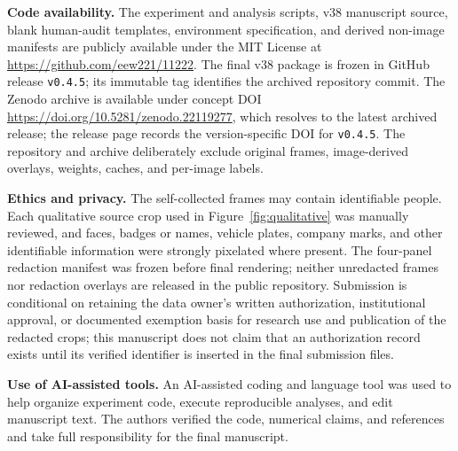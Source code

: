 \documentclass[iicol,pdflatex,sn-mathphys-num]{sn-jnl}
\begin{document}
\textbf{Code availability.} The experiment and analysis scripts, v38 manuscript source, blank human-audit templates, environment specification, and derived non-image manifests are publicly available under the MIT License at \url{https://github.com/eew221/11222}. The final v38 package is frozen in GitHub release \texttt{v0.4.5}; its immutable tag identifies the archived repository commit. The Zenodo archive is available under concept DOI \url{https://doi.org/10.5281/zenodo.22119277}, which resolves to the latest archived release; the release page records the version-specific DOI for \texttt{v0.4.5}. The repository and archive deliberately exclude original frames, image-derived overlays, weights, caches, and per-image labels.

\textbf{Ethics and privacy.} The self-collected frames may contain identifiable people. Each qualitative source crop used in Figure~\ref{fig:qualitative} was manually reviewed, and faces, badges or names, vehicle plates, company marks, and other identifiable information were strongly pixelated where present. The four-panel redaction manifest was frozen before final rendering; neither unredacted frames nor redaction overlays are released in the public repository. Submission is conditional on retaining the data owner's written authorization, institutional approval, or documented exemption basis for research use and publication of the redacted crops; this manuscript does not claim that an authorization record exists until its verified identifier is inserted in the final submission files.

\textbf{Use of AI-assisted tools.} An AI-assisted coding and language tool was used to help organize experiment code, execute reproducible analyses, and edit manuscript text. The authors verified the code, numerical claims, and references and take full responsibility for the final manuscript.


\end{document}
